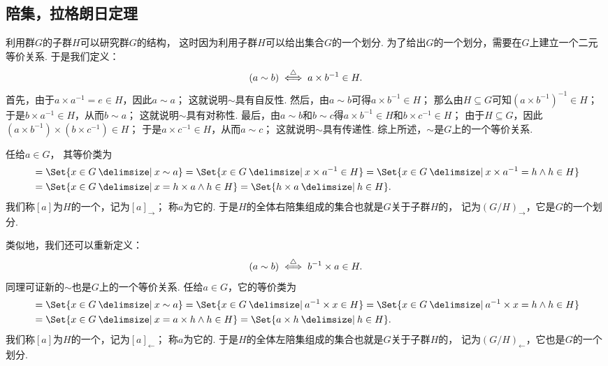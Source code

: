 \subsection{陪集，拉格朗日定理}
利用群\(G\)的子群\(H\)可以研究群\(G\)的结构，
这时因为利用子群\(H\)可以给出集合\(G\)的一个划分.
为了给出\(G\)的一个划分，需要在\(G\)上建立一个二元等价关系.
于是我们定义：\[
	(a \sim b)
	\defiff
	a \times b^{-1} \in H.
\]
首先，由于\(a \times a^{-1} = e \in H\)，因此\(a \sim a\)；
这就说明\(\sim\)具有自反性.
然后，由\(a \sim b\)可得\(a \times b^{-1} \in H\)；
那么由\(H \subseteq G\)可知\((a \times b^{-1})^{-1} \in H\)；
于是\(b \times a^{-1} \in H\)，从而\(b \sim a\)；
这就说明\(\sim\)具有对称性.
最后，由\(a \sim b\)和\(b \sim c\)得\(a \times b^{-1} \in H\)和\(b \times c^{-1} \in H\)；
由于\(H \subseteq G\)，因此\((a \times b^{-1}) \times (b \times c^{-1}) \in H\)；
于是\(a \times c^{-1} \in H\)，从而\(a \sim c\)；
这就说明\(\sim\)具有传递性.
综上所述，\(\sim\)是\(G\)上的一个等价关系.

任给\(a \in G\)，
其等价类为\begin{align*}
	[a] &= \Set{ x \in G \given x \sim a }
	= \Set{ x \in G \given x \times a^{-1} \in H }
	= \Set{ x \in G \given x \times a^{-1} = h \land h \in H } \\
	&= \Set{ x \in G \given x = h \times a \land h \in H }
	= \Set{ h \times a \given h \in H }.
\end{align*}
我们称\([a]\)为\(H\)的一个，记为\([a]_\rightarrow\)；
称\(a\)为它的.
于是\(H\)的全体右陪集组成的集合也就是\(G\)关于子群\(H\)的，
记为\((G/H)_\rightarrow\)，它是\(G\)的一个划分.

类似地，我们还可以重新定义：\[
	(a \sim b)
	\defiff
	b^{-1} \times a \in H.
\]
同理可证新的\(\sim\)也是\(G\)上的一个等价关系.
任给\(a \in G\)，它的等价类为\begin{align*}
	[a] &= \Set{ x \in G \given x \sim a }
	= \Set{ x \in G \given a^{-1} \times x \in H }
	= \Set{ x \in G \given a^{-1} \times x = h \land h \in H } \\
	&= \Set{ x \in G \given x = a \times h \land h \in H }
	= \Set{ a \times h \given h \in H }.
\end{align*}
我们称\([a]\)为\(H\)的一个，记为\([a]_\leftarrow\)；
称\(a\)为它的.
于是\(H\)的全体左陪集组成的集合也就是\(G\)关于子群\(H\)的，
记为\((G/H)_\leftarrow\)，它也是\(G\)的一个划分.

